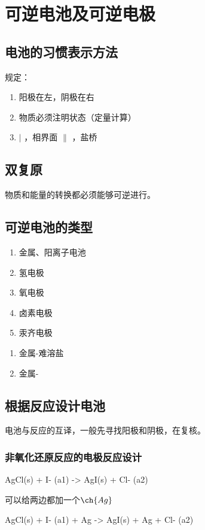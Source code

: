 
    \section{可逆电池及可逆电极}

    \subsection{电池的习惯表示方法}

    规定：

    \begin{enumerate}
        \item 阳极在左，阴极在右
        \item 物质必须注明状态（定量计算）
        \item $\vert$ ，相界面 $\|$ ，盐桥
    \end{enumerate}

    \subsection{双复原}

    物质和能量的转换都必须能够可逆进行。

    \subsection{可逆电池的类型}

    \begin{enumerate}
        \item 金属、阳离子电池
        \item 氢电极
        \item 氧电极
        \item 卤素电极
        \item 汞齐电极
    \end{enumerate}

    \begin{enumerate}
        \item 金属-难溶盐
        \item 金属-
    \end{enumerate}



    \subsection{根据反应设计电池}

    电池与反应的互译，一般先寻找阳极和阴极，在复核。

    \subsubsection{非氧化还原反应的电极反应设计}

    \begin{reaction*}
        AgCl(s) + I- (a1) -> AgI(s) + Cl- (a2)
    \end{reaction*}

    可以给两边都加一个$\ch{Ag}$

    \begin{reaction*}
        AgCl(s) + I- (a1) + Ag -> AgI(s) + Ag + Cl- (a2)
    \end{reaction*}
